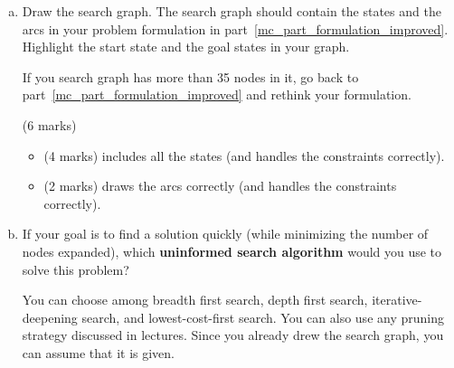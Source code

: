 \documentclass[12pt]{article}
\begin{document}
\begin{enumerate}[(a)]
We will mark your formulation on its correctness and its quality.

\begin{markscheme} (10 marks)

\begin{itemize}
\item
(4 marks) The quality of your formulation.
\item
(2 marks) State definition.
\item
(2 marks) Constraints.
\item
(1 mark) Initial state and goal states.
\item
(1 mark) Successor function.
\end{itemize}

\end{markscheme}


\item
\label{mc_part_graph}
Draw the search graph. The search graph should contain the states and the arcs in your problem formulation in part~\ref{mc_part_formulation_improved}. Highlight the start state and the goal states in your graph.

If you search graph has more than 35 nodes in it, go back to part~\ref{mc_part_formulation_improved} and rethink your formulation.

\begin{markscheme}
(6 marks)
\begin{itemize}
\item
(4 marks) includes all the states (and handles the constraints correctly).
\item
(2 marks) draws the arcs correctly (and handles the constraints correctly).
\end{itemize}

\end{markscheme}



\item
If your goal is to find a solution quickly (while minimizing the number of nodes expanded), which {\bf uninformed search algorithm} would you use to solve this problem?

You can choose among breadth first search, depth first search, iterative-deepening search, and lowest-cost-first search. You can also use any pruning strategy discussed in lectures. Since you already drew the search graph, you can assume that it is given.


\end{enumerate}
\end{document}
